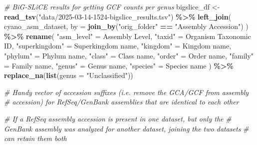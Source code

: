 \documentclass[
]{article}
\newenvironment{Shaded}{\begin{snugshade}}{\end{snugshade}}
\newcommand{\AttributeTok}[1]{\textcolor[rgb]{0.13,0.29,0.53}{#1}}
\newcommand{\CommentTok}[1]{\textcolor[rgb]{0.56,0.35,0.01}{\textit{#1}}}
\newcommand{\FunctionTok}[1]{\textcolor[rgb]{0.13,0.29,0.53}{\textbf{#1}}}
\newcommand{\NormalTok}[1]{#1}
\newcommand{\OtherTok}[1]{\textcolor[rgb]{0.56,0.35,0.01}{#1}}
\newcommand{\SpecialCharTok}[1]{\textcolor[rgb]{0.81,0.36,0.00}{\textbf{#1}}}
\newcommand{\StringTok}[1]{\textcolor[rgb]{0.31,0.60,0.02}{#1}}
\begin{document}
\begin{Shaded}
\begin{Highlighting}[]
\CommentTok{\# BiG{-}SLiCE results for getting GCF counts per genus}
\NormalTok{bigslice\_df }\OtherTok{\textless{}{-}} \FunctionTok{read\_tsv}\NormalTok{(}\StringTok{"data/2025{-}03{-}14{-}1524{-}bigslice\_results.tsv"}\NormalTok{) }\SpecialCharTok{\%\textgreater{}\%}
  \FunctionTok{left\_join}\NormalTok{(}
\NormalTok{    cyano\_asm\_dataset, }
    \AttributeTok{by =} \FunctionTok{join\_by}\NormalTok{(}\StringTok{"orig\_folder"} \SpecialCharTok{==} \StringTok{"Assembly Accession"}\NormalTok{)}
\NormalTok{  ) }\SpecialCharTok{\%\textgreater{}\%}
  \FunctionTok{rename}\NormalTok{(}
    \StringTok{"asm\_level"} \OtherTok{=} \StringTok{\textasciigrave{}}\AttributeTok{Assembly Level}\StringTok{\textasciigrave{}}\NormalTok{,}
    \StringTok{"taxid"} \OtherTok{=} \StringTok{\textasciigrave{}}\AttributeTok{Organism Taxonomic ID}\StringTok{\textasciigrave{}}\NormalTok{,}
    \StringTok{"superkingdom"} \OtherTok{=} \StringTok{\textasciigrave{}}\AttributeTok{Superkingdom name}\StringTok{\textasciigrave{}}\NormalTok{,}
    \StringTok{"kingdom"} \OtherTok{=} \StringTok{\textasciigrave{}}\AttributeTok{Kingdom name}\StringTok{\textasciigrave{}}\NormalTok{,}
    \StringTok{"phylum"} \OtherTok{=} \StringTok{\textasciigrave{}}\AttributeTok{Phylum name}\StringTok{\textasciigrave{}}\NormalTok{,}
    \StringTok{"class"} \OtherTok{=} \StringTok{\textasciigrave{}}\AttributeTok{Class name}\StringTok{\textasciigrave{}}\NormalTok{,}
    \StringTok{"order"} \OtherTok{=} \StringTok{\textasciigrave{}}\AttributeTok{Order name}\StringTok{\textasciigrave{}}\NormalTok{,}
    \StringTok{"family"} \OtherTok{=} \StringTok{\textasciigrave{}}\AttributeTok{Family name}\StringTok{\textasciigrave{}}\NormalTok{,}
    \StringTok{"genus"} \OtherTok{=} \StringTok{\textasciigrave{}}\AttributeTok{Genus name}\StringTok{\textasciigrave{}}\NormalTok{,}
    \StringTok{"species"} \OtherTok{=} \StringTok{\textasciigrave{}}\AttributeTok{Species name}\StringTok{\textasciigrave{}}
\NormalTok{  ) }\SpecialCharTok{\%\textgreater{}\%}
  \FunctionTok{replace\_na}\NormalTok{(}\FunctionTok{list}\NormalTok{(}\AttributeTok{genus =} \StringTok{"Unclassified"}\NormalTok{))}


\CommentTok{\# Handy vector of accession suffixes (i.e. remove the GCA/GCF from assembly }
\CommentTok{\# accession) for RefSeq/GenBank assemblies that are identical to each other}

\CommentTok{\# If a RefSeq assembly accession is present in one dataset, but only the}
\CommentTok{\# GenBank assembly was analyzed for another dataset, joining the two datasets }
\CommentTok{\# can retain them both}



\end{Highlighting}
\end{Shaded}
\end{document}
